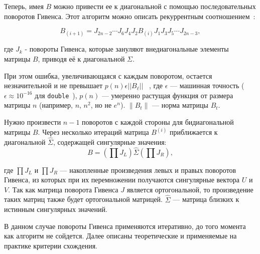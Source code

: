 Теперь, имея $B$ можно привести ее к диагональной с помощью последовательных поворотов Гивенса. Этот алгоритм можно описать рекуррентным соотношением~\cite{Demmel1990}:

\begin{equation}
B_{(i+1)} = J_{2n-2} \cdots J_6 J_4 J_2 B_{(i)} J_1 J_3 J_5 \cdots J_{2n-3},
\end{equation}

где \( J_k \) - повороты Гивенса, которые зануляют внедиагональные элементы матрицы \( B \), приводя её к диагональной \( \Sigma \). 

При этом ошибка, увеличивающаяся с каждым поворотом, остается незначительной и не превышает $p(n) \epsilon ||B_\ell||$ ~\cite{Demmel1990}, где  \( \epsilon \) — машинная точность (\( \epsilon \approx 10^{-16} \) для \texttt{double}~\cite{Golub2013}), \( p(n) \) — умеренно растущая функция от размера матрицы \( n \) (например, \( n \), \( n^2 \), но не \( e^n \)). \( \|B_t\| \) — норма матрицы \( B_t \).

Нужно произвести \( n-1 \) поворотов с каждой стороны для бидиагональной матрицы \( B \). Через несколько итераций матрица \( B^{(i)} \) приближается к диагональной \( \widehat{\Sigma} \), содержащей сингулярные значения:
\begin{equation}
B = \left( \prod J_L \right) \widehat{\Sigma} \left( \prod J_R \right),
\end{equation}

где \( \prod J_L \) и \( \prod J_R \) — накопленные произведения левых и правых поворотов Гивенса, из которых при их перемножении получаются сингулярные вектора \( U \) и \( V \). Так как матрица поворота Гивенса $J$ является ортогональной, то произведение таких матриц также будет ортогональной матрицей.  $\widehat{\Sigma}$ — матрица близких к истинным сингулярных значений.

В данном случае повороты Гивенса применяются итеративно, до того момента как алгоритм не сойдется. Далее описаны теоретические и применяемые на практике критерии схождения.

